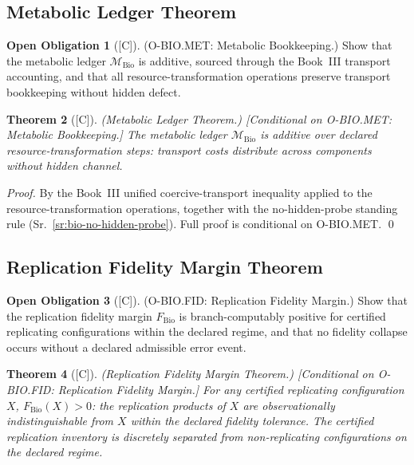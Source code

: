 \documentclass[12pt,oneside]{amsbook}
\theoremstyle{plain}
\newtheorem{theorem}{Theorem}[section]
\theoremstyle{definition}
\newtheorem{obligation}[theorem]{Open Obligation}
\theoremstyle{remark}
\newcommand{\status}[1]{\textup{[#1]}}
\begin{document}
\subsection{Metabolic Ledger Theorem}\label{sec:bio-MET}

\begin{obligation}[\status{C}]\label{ob:bio-MET}
\textup{(O-BIO.MET: Metabolic Bookkeeping.)}
Show that the metabolic ledger $\mathcal{M}_{\mathrm{Bio}}$ is
additive, sourced through the Book~III transport accounting, and that
all resource-transformation operations preserve transport bookkeeping
without hidden defect.
\end{obligation}

\begin{theorem}[\status{C}]\label{thm:bio-metabolic-ledger}
\textup{(Metabolic Ledger Theorem.)}
\textup{[Conditional on O-BIO.MET: Metabolic Bookkeeping.]}
The metabolic ledger $\mathcal{M}_{\mathrm{Bio}}$ is additive over
declared resource-transformation steps: transport costs distribute
across components without hidden channel.
\end{theorem}

\begin{proof}
By the Book~III unified coercive-transport inequality applied to the
resource-transformation operations, together with the no-hidden-probe
standing rule (Sr.~\ref{sr:bio-no-hidden-probe}). Full proof is
conditional on O-BIO.MET.
\qed
\end{proof}

\subsection{Replication Fidelity Margin Theorem}\label{sec:bio-FID}

\begin{obligation}[\status{C}]\label{ob:bio-FID}
\textup{(O-BIO.FID: Replication Fidelity Margin.)}
Show that the replication fidelity margin $F_{\mathrm{Bio}}$ is
branch-computably positive for certified replicating configurations
within the declared regime, and that no fidelity collapse occurs
without a declared admissible error event.
\end{obligation}

\begin{theorem}[\status{C}]\label{thm:bio-fidelity-margin}
\textup{(Replication Fidelity Margin Theorem.)}
\textup{[Conditional on O-BIO.FID: Replication Fidelity Margin.]}
For any certified replicating configuration $X$, $F_{\mathrm{Bio}}(X)
> 0$: the replication products of $X$ are observationally
indistinguishable from $X$ within the declared fidelity tolerance.
The certified replication inventory is discretely separated from
non-replicating configurations on the declared regime.
\end{theorem}
\end{document}
